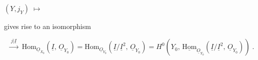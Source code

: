$(Y, j_Y) \;\longmapsto\;$
gives rise to an isomorphism

\begin{equation*}
[B] \;\xrightarrow{\;j|\underline{I}\;}\; \mathrm{Hom}_{\underline{O}_{X_0}}(\underline{I},\, \underline{O}_{Y_0}) = \mathrm{Hom}_{\underline{O}_{Y_0}}(\underline{I}/\underline{I}^2,\, \underline{O}_{Y_0}) = H^0(Y_0,\, \underline{\mathrm{Hom}}_{\underline{O}_{Y_0}}(\underline{I}/\underline{I}^2,\, \underline{O}_{Y_0}))\;.
\end{equation*}


